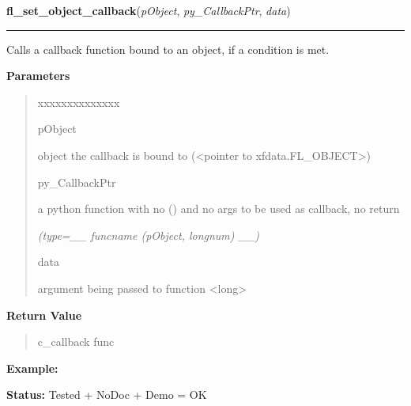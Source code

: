 \hspace{.8\funcindent}\begin{boxedminipage}{\funcwidth}

    \raggedright \textbf{fl\_set\_object\_callback}(\textit{pObject}, \textit{py\_CallbackPtr}, \textit{data})

    \vspace{-1.5ex}

    \rule{\textwidth}{0.5\fboxrule}
\setlength{\parskip}{2ex}
    Calls a callback function bound to an object, if a condition is met.

\setlength{\parskip}{1ex}
      \textbf{Parameters}
      \vspace{-1ex}

      \begin{quote}
        \begin{Ventry}{xxxxxxxxxxxxxx}

          \item[pObject]

          object the callback is bound to ({\textless}pointer to 
          xfdata.FL\_OBJECT{\textgreater})

          \item[py\_CallbackPtr]

          a python function with no () and no args to be used as callback, 
          no return

            {\it (type=\_\_ funcname (pObject, longnum) \_\_)}

          \item[data]

          argument being passed to function {\textless}long{\textgreater}

        \end{Ventry}

      \end{quote}

      \textbf{Return Value}
    \vspace{-1ex}

      \begin{quote}
      c\_callback func

      \end{quote}

\textbf{Example:} 

\textbf{Status:} Tested + NoDoc + Demo = OK



    \end{boxedminipage}


